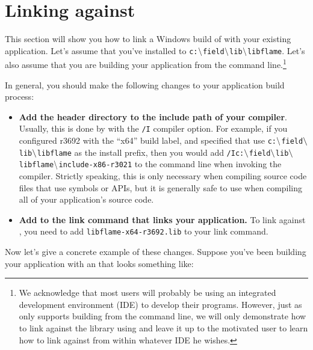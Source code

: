 \section{Linking against \libflame}
\label{sec:linking-win}


This section will show you how to link a Windows build of \libflame with
your existing application.
Let's assume that you've installed \libflame to
{\tt c:$\backslash$field$\backslash$lib$\backslash$libflame}.
Let's also assume that you are building your application from the command
line.\footnote{
We acknowledge that most users will probably be using an integrated
development environment (IDE) to develop their programs.
However, just as \libflame only supports building from the command line,
we will only demonstrate how to link against the library using \nmake and
leave it up to the motivated user to learn how to link against \libflame
from within whatever IDE he wishes.}

In general, you should make the following changes to your application build
process:
\begin{itemize}
\item
{\bf Add the \libflame header directory to the include path of your compiler}.
Usually, this is done by with the {\tt /I} compiler option.
For example, if you configured \libflame r3692 with the ``x64'' build label,
and specified that \configurecmd use
{\tt c:$\backslash$field$\backslash$lib$\backslash$libflame} as the
install prefix, then you would add
{\tt /Ic:$\backslash$field$\backslash$lib$\backslash$libflame$\backslash$include-x86-r3021} to the command
line when invoking the compiler.
Strictly speaking, this is only necessary when compiling source code files
that use \libflame symbols or APIs, but it is generally safe to use when compiling
all of your application's source code.
\item
{\bf Add \libflame to the link command that links your application.}
To link against \libflamens, you need to add
{\tt libflame-x64-r3692.lib} to your link command.
\end{itemize}

Now let's give a concrete example of these changes.
Suppose you've been building your application with an \nmake \makefile that
looks something like:


